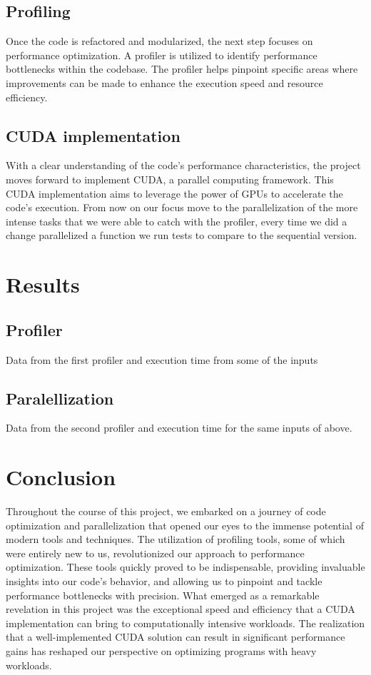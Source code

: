 \documentclass[10pt,journal,compsoc]{IEEEtran}
\begin{document}
\subsection{Profiling}
Once the code is refactored and modularized, the next step focuses on performance optimization. A profiler is utilized to identify performance bottlenecks within the codebase. The profiler helps pinpoint specific areas where improvements can be made to enhance the execution speed and resource efficiency.

\subsection{CUDA implementation}
With a clear understanding of the code's performance characteristics, the project moves forward to implement CUDA, a parallel computing framework. This CUDA implementation aims to leverage the power of GPUs to accelerate the code's execution. From now on our focus move to the parallelization of the more intense tasks that we were able to catch with the profiler, every time we did a change parallelized a function we run tests to compare to the sequential version. 

\section{Results}
\subsection{Profiler}
Data from the first profiler and execution time from some of the inputs

\subsection{Paralellization}
Data from the second profiler and execution time for the same inputs of above.

\section{Conclusion}
Throughout the course of this project, we embarked on a journey of code optimization and parallelization that opened our eyes to the immense potential of modern tools and techniques. The utilization of profiling tools, some of which were entirely new to us, revolutionized our approach to performance optimization. These tools quickly proved to be indispensable, providing invaluable insights into our code's behavior, and allowing us to pinpoint and tackle performance bottlenecks with precision. What emerged as a remarkable revelation in this project was the exceptional speed and efficiency that a CUDA implementation can bring to computationally intensive workloads. The realization that a well-implemented CUDA solution can result in significant performance gains has reshaped our perspective on optimizing programs with heavy workloads.
\end{document}
